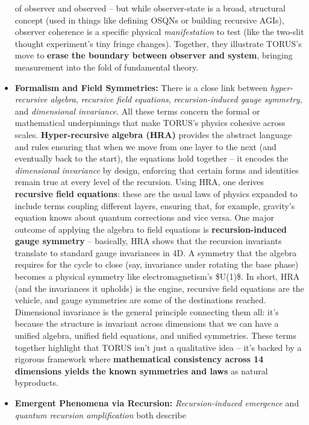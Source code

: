 \begin{itemize}
  of observer and observed -- but while observer-state is a broad,
  structural concept (used in things like defining OSQNs or building
  recursive AGIs), observer coherence is a specific physical
  \emph{manifestation} to test (like the two-slit thought experiment's
  tiny fringe changes). Together, they illustrate TORUS's move to
  \textbf{erase the boundary between observer and system}, bringing
  measurement into the fold of fundamental theory.
\item
  \textbf{Formalism and Field Symmetries:} There is a close link between
  \emph{hyper-recursive algebra}, \emph{recursive field equations},
  \emph{recursion-induced gauge symmetry}, and \emph{dimensional
  invariance}. All these terms concern the formal or mathematical
  underpinnings that make TORUS's physics cohesive across scales.
  \textbf{Hyper-recursive algebra (HRA)} provides the abstract language
  and rules ensuring that when we move from one layer to the next (and
  eventually back to the start), the equations hold together -- it
  encodes the \emph{dimensional invariance} by design, enforcing that
  certain forms and identities remain true at every level of the
  recursion​. Using HRA, one derives \textbf{recursive field equations}:
  these are the usual laws of physics expanded to include terms coupling
  different layers, ensuring that, for example, gravity's equation knows
  about quantum corrections and vice versa​. One major outcome of
  applying the algebra to field equations is \textbf{recursion-induced
  gauge symmetry} -- basically, HRA shows that the recursion invariants
  translate to standard gauge invariances in 4D​. A symmetry that the
  algebra requires for the cycle to close (say, invariance under
  rotating the base phase) becomes a physical symmetry like
  electromagnetism's \$U(1)\$. In short, HRA (and the invariances it
  upholds) is the engine, recursive field equations are the vehicle, and
  gauge symmetries are some of the destinations reached. Dimensional
  invariance is the general principle connecting them all: it's because
  the structure is invariant across dimensions that we can have a
  unified algebra, unified field equations, and unified symmetries.
  These terms together highlight that TORUS isn't just a qualitative
  idea -- it's backed by a rigorous framework where \textbf{mathematical
  consistency across 14 dimensions yields the known symmetries and laws}
  as natural byproducts.
\item
  \textbf{Emergent Phenomena via Recursion:} \emph{Recursion-induced
  emergence} and \emph{quantum recursion amplification} both describe

\end{itemize}

